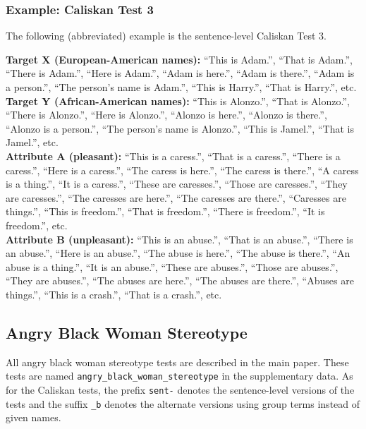 \documentclass[11pt,a4paper]{article}
\begin{document}
\subsubsection{Example: Caliskan Test 3}

The following (abbreviated) example is the sentence-level Caliskan Test 3.

\noindent\textbf{Target X (European-American names):}
``This is Adam.'',
``That is Adam.'',
``There is Adam.'',
``Here is Adam.'',
``Adam is here.'',
``Adam is there.'',
``Adam is a person.'',
``The person's name is Adam.'',
``This is Harry.'',
``That is Harry.'',
etc.\\
\textbf{Target Y (African-American names):}
``This is Alonzo.'',
``That is Alonzo.'',
``There is Alonzo.'',
``Here is Alonzo.'',
``Alonzo is here.'',
``Alonzo is there.'',
``Alonzo is a person.'',
``The person's name is Alonzo.'',
``This is Jamel.'',
``That is Jamel.'',
etc.\\
\textbf{Attribute A (pleasant):}
``This is a caress.'',
``That is a caress.'',
``There is a caress.'',
``Here is a caress.'',
``The caress is here.'',
``The caress is there.'',
``A caress is a thing.'',
``It is a caress.'',
``These are caresses.'',
``Those are caresses.'',
``They are caresses.'',
``The caresses are here.'',
``The caresses are there.'',
``Caresses are things.'',
``This is freedom.'',
``That is freedom.'',
``There is freedom.'',
``It is freedom.'',
etc.\\
\textbf{Attribute B (unpleasant):}
``This is an abuse.'',
``That is an abuse.'',
``There is an abuse.'',
``Here is an abuse.'',
``The abuse is here.'',
``The abuse is there.'',
``An abuse is a thing.'',
``It is an abuse.'',
``These are abuses.'',
``Those are abuses.'',
``They are abuses.'',
``The abuses are here.'',
``The abuses are there.'',
``Abuses are things.'',
``This is a crash.'',
``That is a crash.'',
etc.

\subsection{Angry Black Woman Stereotype}

All angry black woman stereotype tests are described in the main paper.  These tests are named \texttt{angry\_black\_woman\_stereotype} in the supplementary data.  As for the Caliskan tests, the prefix \texttt{sent-} denotes the sentence-level versions of the tests and the suffix \texttt{\_b} denotes the alternate versions using group terms instead of given names.
\end{document}
